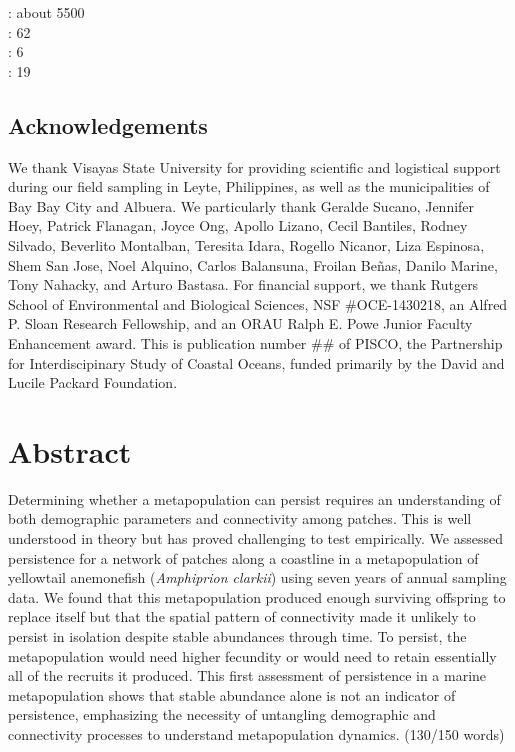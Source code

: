 \documentclass[12pt, oneside]{article}   	%
\begin{document}
: about 5500 \\ 

: 62 \\ 

: 6 \\ 

: 19 \\ 

\subsection*{Acknowledgements}
We thank Visayas State University for providing scientific and logistical support during our field sampling in Leyte, Philippines, as well as the municipalities of Bay Bay City and Albuera. We particularly thank Geralde Sucano, Jennifer Hoey, Patrick Flanagan, Joyce Ong, Apollo Lizano, Cecil Bantiles, Rodney Silvado, Beverlito Montalban, Teresita Idara, Rogello Nicanor, Liza Espinosa, Shem San Jose, Noel Alquino, Carlos Balansuna, Froilan Beñas, Danilo Marine, Tony Nahacky, and Arturo Bastasa. For financial support, we thank Rutgers School of Environmental and Biological Sciences, NSF \#OCE-1430218, an Alfred P. Sloan Research Fellowship, and an ORAU Ralph E. Powe Junior Faculty Enhancement award. This is publication number \#\# of PISCO, the Partnership for Interdiscipinary Study of Coastal Oceans, funded primarily by the David and Lucile Packard Foundation.

\bigskip

\section*{Abstract}
Determining whether a metapopulation can persist requires an understanding of both demographic parameters and connectivity among patches. This is well understood in theory but has proved challenging to test empirically. We assessed persistence for a network of patches along a coastline in a metapopulation of yellowtail anemonefish (\textit{Amphiprion clarkii}) using seven years of annual sampling data. We found that this metapopulation produced enough surviving offspring to replace itself but that the spatial pattern of connectivity made it unlikely to persist in isolation despite stable abundances through time. To persist, the metapopulation would need higher fecundity or would need to retain essentially all of the recruits it produced. This first assessment of persistence in a marine metapopulation shows that stable abundance alone is not an indicator of persistence, emphasizing the necessity of untangling demographic and connectivity processes to understand metapopulation dynamics. (130/150 words) %
\end{document}
